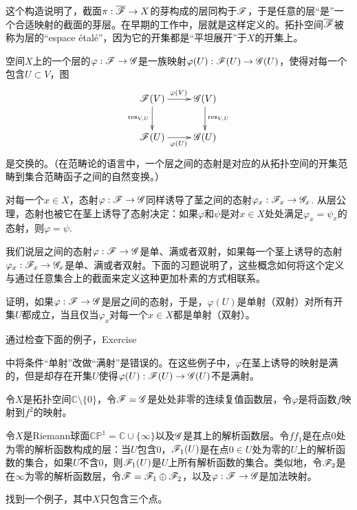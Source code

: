 这个构造说明了，截面$\pi:\overline{\mathscr{F}}\to X$的芽构成的层同构于$\mathscr{F}$，于是任意的层“是”一个合适映射的截面的芽层。在早期的工作中，层就是这样定义的。拓扑空间$\overline{\mathscr{F}}$被称为层的``espace \'{e}tal\'{e}''，因为它的开集都是“平坦展开”于$X$的开集上。

空间$X$上的一个层的$\varphi:\mathscr{F}\to\mathscr{G}$是一族映射$\varphi(U):\mathscr{F}(U)\to \mathscr{G}(U)$，使得对每一个包含$U\subset V$，图
\[
	\xymatrix{
	\ff(V)\ar[r]^{\varphi(V)}\ar[d]_{\res_{V,U}}&\scrg(V)\ar[d]^{\res_{V,U}}\\
	\ff(U)\ar[r]_{\varphi(U)}&\scrg(U)
	}
\]
是交换的。（在范畴论的语言中，一个层之间的态射是对应的从拓扑空间的开集范畴到集合范畴函子之间的自然变换。）

对每一个$x\in X$，态射$\varphi:\mathscr{F}\to\mathscr{G}$同样诱导了茎之间的态射$\varphi_x:\mathscr{F}_x\to\mathscr{G}_x$. 从层公理，态射也被它在茎上诱导了态射决定：如果$\varphi$和$\psi$是对$x\in X$处处满足$\varphi_x=\psi_x$的态射，则$\varphi=\psi$.

我们说层之间的态射$\varphi:\mathscr{F}\to\mathscr{G}$是单、满或者双射，如果每一个茎上诱导的态射$\varphi_x:\mathscr{F}_x\to\mathscr{G}_x$是单、满或者双射。下面的习题说明了，这些概念如何将这个定义与通过任意集合上的截面来定义这种更加朴素的方式相联系。

\begin{exe}
	证明，如果$\varphi:\mathscr{F}\to\mathscr{G}$是层之间的态射，于是，$\varphi(U)$是单射（双射）对所有开集$U$都成立，当且仅当$\varphi_x$对每一个$x\in X$都是单射（双射）。
\end{exe}

\begin{exe}
	通过检查下面的例子，Exercise {{\addtocounter{thm}{-1}}\thethm{\addtocounter{thm}{1}}}中将条件“单射”改做“满射”是错误的。在这些例子中，$\varphi$在茎上诱导的映射是满的，但是却存在开集$U$使得$\varphi(U):\mathscr{F}(U)\to \mathscr{G}(U)$不是满射。
	\begin{compactenum}[(a)]
	\item 令$X$是拓扑空间$\mathbb{C}\setminus \{0\}$，令$\mathscr{F}=\mathscr{G}$是处处非零的连续复值函数层，令$\varphi$是将函数$f$映射到$f^2$的映射。

	\item 令$X$是Riemann球面$\mathbb{CP}^1=\mathbb{C}\cup\{\infty\}$以及$\mathscr{G}$是其上的解析函数层。令$ff_1$是在点$0$处为零的解析函数构成的层：当$U$包含$0$，$\mathscr{F}_1(U)$是在点$0\in U$处为零的$U$上的解析函数的集合，如果$U$不含$0$，则$\mathscr{F}_1(U)$是$U$上所有解析函数的集合。类似地，令$\mathscr{F}_2$是在$\infty$为零的解析函数层，令$\mathscr{F}=\mathscr{F}_1\oplus\mathscr{F}_2$，以及$\varphi:\mathscr{F}\to\mathscr{G}$是加法映射。

	\item 找到一个例子，其中$X$只包含三个点。
	\end{compactenum}
\end{exe}

